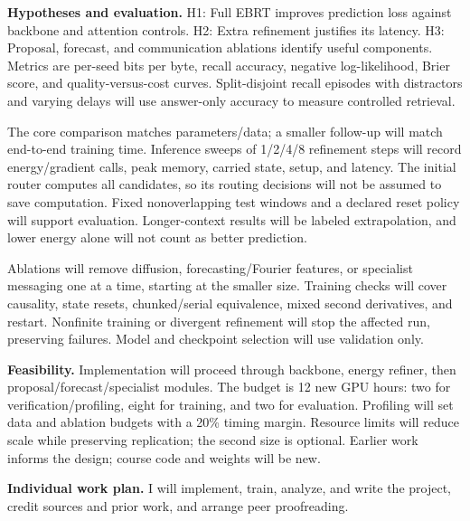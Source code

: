 \documentclass[11pt,letterpaper]{article}
\begin{document}
\textbf{Hypotheses and evaluation.} H1: Full EBRT improves prediction loss against backbone and attention controls. H2: Extra refinement justifies its latency. H3: Proposal, forecast, and communication ablations identify useful components. Metrics are per-seed bits per byte, recall accuracy, negative log-likelihood, Brier score, and quality-versus-cost curves. Split-disjoint recall episodes with distractors and varying delays will use answer-only accuracy to measure controlled retrieval.

The core comparison matches parameters/data; a smaller follow-up will match end-to-end training time. Inference sweeps of 1/2/4/8 refinement steps will record energy/gradient calls, peak memory, carried state, setup, and latency. The initial router computes all candidates, so its routing decisions will not be assumed to save computation. Fixed nonoverlapping test windows and a declared reset policy will support evaluation. Longer-context results will be labeled extrapolation, and lower energy alone will not count as better prediction.

Ablations will remove diffusion, forecasting/Fourier features, or specialist messaging one at a time, starting at the smaller size. Training checks will cover causality, state resets, chunked/serial equivalence, mixed second derivatives, and restart. Nonfinite training or divergent refinement will stop the affected run, preserving failures. Model and checkpoint selection will use validation only.

\textbf{Feasibility.} Implementation will proceed through backbone, energy refiner, then proposal/forecast/specialist modules. The budget is 12 new GPU hours: two for verification/profiling, eight for training, and two for evaluation. Profiling will set data and ablation budgets with a 20\% timing margin. Resource limits will reduce scale while preserving replication; the second size is optional. Earlier work informs the design; course code and weights will be new.

\textbf{Individual work plan.} I will implement, train, analyze, and write the project, credit sources and prior work, and arrange peer proofreading.
\end{document}
